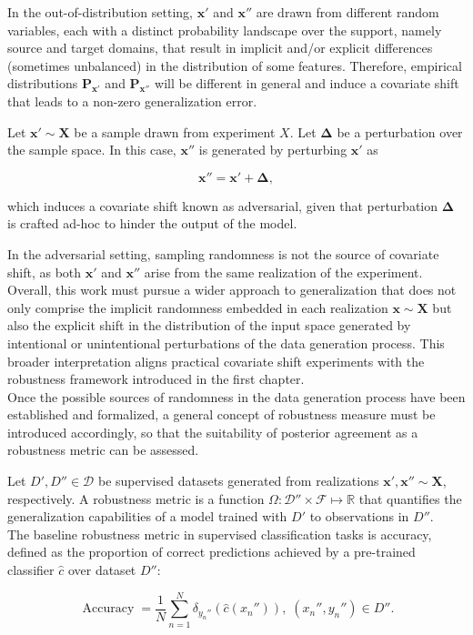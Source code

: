 In the out-of-distribution setting, $\bm{x}'$ and $\bm{x}''$ are
drawn from different random variables, each with a distinct probability 
landscape over the support, namely source and target domains, that result 
in implicit and/or explicit differences (sometimes unbalanced) in the distribution of some features.
Therefore, empirical distributions $\mathbf{P}_{\bm{x}'}$ and $\mathbf{P}_{\bm{x}''}$ will
be different in general and induce a covariate shift that leads
to a non-zero generalization error.

\begin{definition}
    Let $\bm{x}' \sim \bm{X}$ be a sample drawn from experiment
    $X$. Let $\bm{\Delta}$ be a perturbation over
    the sample space. In this case, $\bm{x}''$ is generated by perturbing $\bm{x}'$ as

    $$
    \bm{x}'' = \bm{x}' + \bm{\Delta},
    $$

    which induces a covariate shift known as adversarial, given that
    perturbation $\bm{\Delta}$ is crafted ad-hoc to hinder the 
    output of the model.
\end{definition}

In the adversarial setting, sampling randomness is not the source of
covariate shift, as both $\bm{x}'$ and $\bm{x}''$ arise from
the same realization of the experiment. \\

Overall, this work must pursue a wider approach to generalization  
that does not only comprise the implicit
randomness embedded in each realization $\bm{x} \sim \bm{X}$
but also the explicit shift in the distribution of the input space
generated by intentional or unintentional perturbations of the 
data generation process. This broader interpretation aligns practical
covariate shift experiments with the robustness framework
introduced in the first chapter.\\

Once the possible sources of randomness in the data 
generation process have been established and formalized, 
a general concept of robustness measure must be introduced 
accordingly, so that the suitability of posterior agreement
as a robustness metric can be assessed.

\begin{definition}
    Let $D', D'' \in \mathcal{D}$ be supervised datasets generated from realizations $\bm{x}', \bm{x}'' \sim \bm{X}$,
    respectively. 
    A robustness metric is a function $\Omega: \mathcal{D}'' \times \mathcal{F} \longmapsto \mathbb{R}$ 
    that quantifies the generalization capabilities of a model trained with $D'$ to observations in $D''$. \\

    The baseline robustness metric in supervised classification tasks is
    accuracy, defined as the proportion of correct predictions 
    achieved by a pre-trained classifier $\hat{c}$ over 
    dataset $D''$:

    $$
    \operatorname{Accuracy} = \frac{1}{N} \sum_{n=1}^N \delta_{y_n''} \left ( \hat{c}(x_n'') \right ), \; (x_n'', y_n'') \in D''.
    $$

\end{definition}

